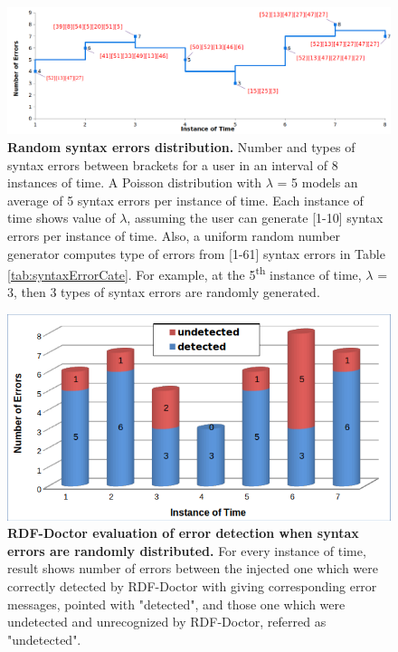 	\begin{figure}[ht]
	\begin{center}
		\includegraphics[scale=0.45,angle=0]{images/Experiment02-01.png}
		\setlength\belowcaptionskip{-5mm}
		\caption{\textbf{Random syntax errors distribution.} Number and types of syntax errors between brackets for a user in an interval of 8 instances of time. A Poisson  distribution with $\lambda$ = 5 models an average of 5 syntax errors per instance of time. Each instance of time shows value of $\lambda$, assuming the user can generate [1-10] syntax errors per instance of time. Also, a uniform random number generator computes type of errors from [1-61] syntax errors in Table \ref{tab:syntaxErrorCate}. For example, at the 5\textsuperscript{th} instance of time, $\lambda$ = 3, then 3 types of syntax errors are randomly generated.} 
		\label{Fig:experiment2}
	\end{center}
\end{figure}



	\begin{figure}[ht]
	\begin{center}
		\includegraphics[scale=0.7,angle=0]{images/Experiment02-02.png}
		\setlength\belowcaptionskip{-5mm}
		\caption{\textbf{RDF-Doctor evaluation of error detection when syntax errors are randomly distributed.} For every instance of time, result shows number of errors between the injected one which were correctly detected by RDF-Doctor with giving corresponding error messages, pointed with "detected", and those one which were undetected and unrecognized by RDF-Doctor, referred as "undetected".} 
		\label{Fig:Experiment02-02}
	\end{center}
\end{figure}

